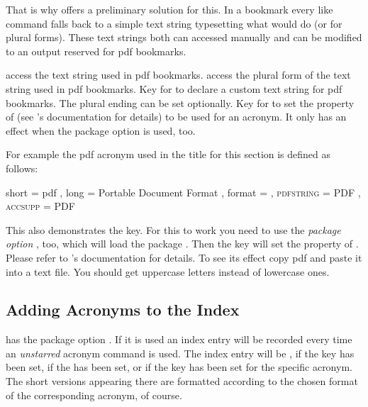 \documentclass[DIV10,toc=index,toc=bib,hyperfootnotes=false]{cnpkgdoc}
\begin{document}
That is why \acro offers a preliminary solution for this. In a bookmark every
 like command falls back to a simple text string typesetting what 
would do (or  for plural forms). These text strings both can accessed
manually and can be modified to an output reserved for \acs{pdf} bookmarks.

\begin{beschreibung}
 \newline
   access the text string used in \acs{pdf} bookmarks.
 \newline
   access the plural form of the text string used in \acs{pdf} bookmarks.
 \newline
   Key for  to declare a custom text string for \acs{pdf}
   bookmarks. The plural ending can be set optionally.
 \newline
   Key for  to set the 
   property of  (see 's documentation for details)
   to be used for an acronym. It only has an effect when the package option 
   is used, too.
\end{beschreibung}

For example the \acs{pdf} acronym used in the title for this section is defined
as follows:
\begin{beispiel}
  {
    short     = pdf ,
    long      = Portable Document Format ,
    format    = \scshape ,
    pdfstring = PDF ,
    accsupp   = PDF
  }
\end{beispiel}

This also demonstrates the  key. For this to work you need to use
the \emph{package option} , too, which will load the package
. Then the key  will set the 
property of . Please refer to 's documentation
for details. To see its effect copy \ac{pdf} and paste it into a text file. You
should get uppercase letters instead of lowercase ones.

\subsection{Adding Acronyms to the Index}\label{ssec:index}
\noindent{}\acro has the package option . If it is
used an index entry will be recorded every time an \emph{unstarred} acronym
command is used. The index entry will be , 
if the  key has been set,  if the
 has been set, or  if the key  has been
set for the specific acronym. The short versions appearing there are formatted
according to the chosen format of the corresponding acronym, of course.
\end{document}
